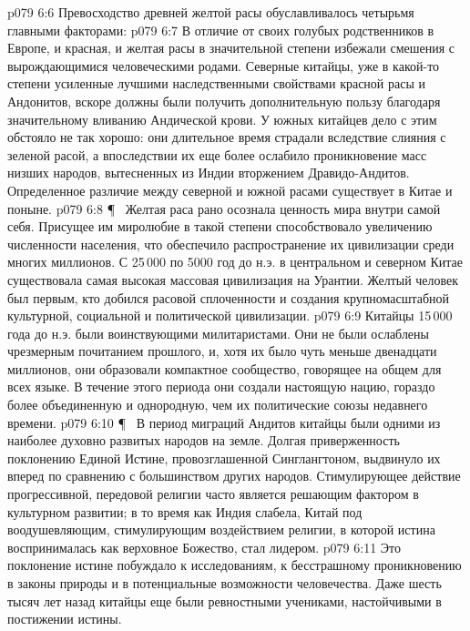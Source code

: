 \vs p079 6:6 Превосходство древней желтой расы обуславливалось четырьмя главными факторами:
\vs p079 6:7 \bibnobreakspace {} В отличие от своих голубых родственников в Европе, и красная, и желтая расы в значительной степени избежали смешения с вырождающимися человеческими родами. Северные китайцы, уже в какой\hyp{}то степени усиленные лучшими наследственными свойствами красной расы и Андонитов, вскоре должны были получить дополнительную пользу благодаря значительному вливанию Андической крови. У южных китайцев дело с этим обстояло не так хорошо: они длительное время страдали вследствие слияния с зеленой расой, а впоследствии их еще более ослабило проникновение масс низших народов, вытесненных из Индии вторжением Дравидо\hyp{}Андитов. Определенное различие между северной и южной расами существует в Китае и поныне.
\vs p079 6:8 \P\ \bibnobreakspace {} Желтая раса рано осознала ценность мира внутри самой себя. Присущее им миролюбие в такой степени способствовало увеличению численности населения, что обеспечило распространение их цивилизации среди многих миллионов. С 25\,000 по 5000 год до н.э. в центральном и северном Китае существовала самая высокая массовая цивилизация на Урантии. Желтый человек был первым, кто добился расовой сплоченности и создания крупномасштабной культурной, социальной и политической цивилизации.
\vs p079 6:9 Китайцы 15\,000 года до н.э. были воинствующими милитаристами. Они не были ослаблены чрезмерным почитанием прошлого, и, хотя их было чуть меньше двенадцати миллионов, они образовали компактное сообщество, говорящее на общем для всех языке. В течение этого периода они создали настоящую нацию, гораздо более объединенную и однородную, чем их политические союзы недавнего времени.
\vs p079 6:10 \P\ \bibnobreakspace {} В период миграций Андитов китайцы были одними из наиболее духовно развитых народов на земле. Долгая приверженность поклонению Единой Истине, провозглашенной Синглангтоном, выдвинуло их вперед по сравнению с большинством других народов. Стимулирующее действие прогрессивной, передовой религии часто является решающим фактором в культурном развитии; в то время как Индия слабела, Китай под воодушевляющим, стимулирующим воздействием религии, в которой истина воспринималась как верховное Божество, стал лидером.
\vs p079 6:11 Это поклонение истине побуждало к исследованиям, к бесстрашному проникновению в законы природы и в потенциальные возможности человечества. Даже шесть тысяч лет назад китайцы еще были ревностными учениками, настойчивыми в постижении истины.
